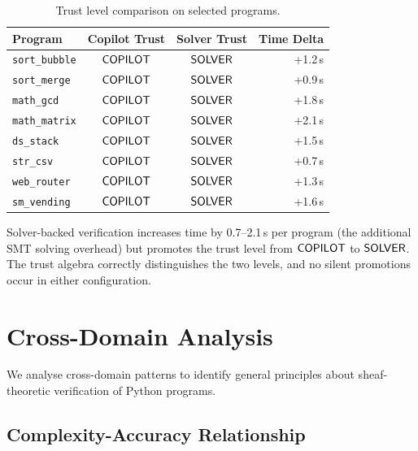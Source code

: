 \documentclass[11pt]{article}
\begin{document}
\begin{table}[H]
\centering
\caption{Trust level comparison on selected programs.}\label{tab:trust-sensitivity}
\begin{tabular}{@{}l c c r@{}}
\toprule
\textbf{Program} & \textbf{Copilot Trust} & \textbf{Solver Trust}
  & \textbf{Time Delta} \\
\midrule
\texttt{sort\_bubble}  & $\mathsf{COPILOT}$ & $\mathsf{SOLVER}$ & +1.2\,s \\
\texttt{sort\_merge}   & $\mathsf{COPILOT}$ & $\mathsf{SOLVER}$ & +0.9\,s \\
\texttt{math\_gcd}     & $\mathsf{COPILOT}$ & $\mathsf{SOLVER}$ & +1.8\,s \\
\texttt{math\_matrix}  & $\mathsf{COPILOT}$ & $\mathsf{SOLVER}$ & +2.1\,s \\
\texttt{ds\_stack}     & $\mathsf{COPILOT}$ & $\mathsf{SOLVER}$ & +1.5\,s \\
\texttt{str\_csv}      & $\mathsf{COPILOT}$ & $\mathsf{SOLVER}$ & +0.7\,s \\
\texttt{web\_router}   & $\mathsf{COPILOT}$ & $\mathsf{SOLVER}$ & +1.3\,s \\
\texttt{sm\_vending}   & $\mathsf{COPILOT}$ & $\mathsf{SOLVER}$ & +1.6\,s \\
\bottomrule
\end{tabular}
\end{table}

Solver-backed verification increases time by 0.7--2.1\,s per program
(the additional SMT solving overhead) but promotes the trust level
from $\mathsf{COPILOT}$ to $\mathsf{SOLVER}$.  The trust algebra correctly
distinguishes the two levels, and no silent promotions occur in
either configuration.

\section{Cross-Domain Analysis}\label{sec:cross-domain}

We analyse cross-domain patterns to identify general principles about
sheaf-theoretic verification of Python programs.

\subsection{Complexity-Accuracy Relationship}
\end{document}
